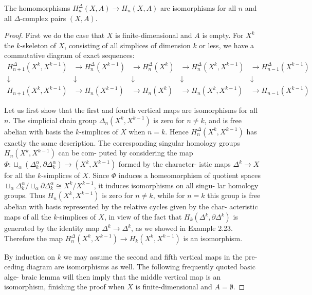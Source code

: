 \begin{theorem}
\label{thm:simplicial-singular-homology-isomorphic}
The homomorphisms $H_n^\Delta(X,A) \to H_n(X,A)$ are isomorphisms for
all $n$ and all $\Delta$-complex pairs $(X,A)$.
\end{theorem}
\begin{proof}
 First we do the case that $X$ is finite-dimensional and $A$ is empty. For $X^k$
the $k$-skeleton of $X$, consisting of all simplices of dimension $k$ or less, we have a
commutative diagram of exact sequences:
\[
\begin{array}{ccccc}
H_{n+1}^\Delta(X^k, X^{k-1}) & \to H_n^\Delta(X^{k-1}) & \to H_n^\Delta(X^k) & \to H_n^\Delta(X^k, X^{k-1}) & \to H_{n-1}^\Delta(X^{k-1}) \\
\downarrow & \downarrow & \downarrow & \downarrow & \downarrow \\
H_{n+1}(X^k, X^{k-1}) & \to H_n(X^{k-1}) & \to H_n(X^k) & \to H_n(X^k, X^{k-1}) & \to H_{n-1}(X^{k-1})
\end{array}
\]

Let us first show that the first and fourth vertical maps are isomorphisms for all $n$.
The simplicial chain group $\Delta_n(X^k, X^{k-1})$ is zero for $n \ne k$, and is free abelian with
basis the $k$-simplices of $X$ when $n = k$. Hence $H_n^\Delta(X^k, X^{k-1})$ has exactly the same
description. The corresponding singular homology groups $H_n(X^k, X^{k-1})$ can be com-
puted by considering the map $\Phi: \sqcup_\alpha(\Delta_k^\alpha, \partial \Delta_k^\alpha) \to (X^k, X^{k-1})$ formed by the character-
istic maps $\Delta^k \to X$ for all the $k$-simplices of $X$. Since $\Phi$ induces a homeomorphism
of quotient spaces $\sqcup_\alpha \Delta_k^\alpha / \sqcup_\alpha \partial \Delta_k^\alpha \cong X^k/X^{k-1}$, it induces isomorphisms on all singu-
lar homology groups. Thus $H_n(X^k, X^{k-1})$ is zero for $n \ne k$, while for $n = k$ this
group is free abelian with basis represented by the relative cycles given by the char-
acteristic maps of all the $k$-simplices of $X$, in view of the fact that $H_k(\Delta^k, \partial\Delta^k)$ is
generated by the identity map $\Delta^k \to \Delta^k$, as we showed in Example 2.23. Therefore the
map $H_n^\Delta(X^k, X^{k-1}) \to H_k(X^k, X^{k-1})$ is an isomorphism.

By induction on $k$ we may assume the second and fifth vertical maps in the pre-
ceding diagram are isomorphisms as well. The following frequently quoted basic alge-
braic lemma will then imply that the middle vertical map is an isomorphism, finishing
the proof when $X$ is finite-dimensional and $A = \emptyset$. \end{proof}

